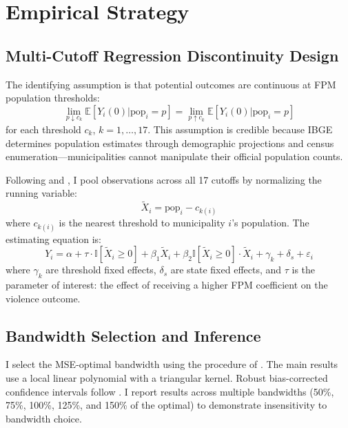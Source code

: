 \documentclass[12pt]{article}
\newcommand{\E}{\mathbb{E}}
\newcommand{\ind}{\mathbb{I}}
\begin{document}


\section{Empirical Strategy}

\subsection{Multi-Cutoff Regression Discontinuity Design}

The identifying assumption is that potential outcomes are continuous at FPM population thresholds:
\begin{equation}
\lim_{p \downarrow c_k} \E[Y_i(0) | \text{pop}_i = p] = \lim_{p \uparrow c_k} \E[Y_i(0) | \text{pop}_i = p]
\end{equation}
for each threshold $c_k$, $k = 1, \ldots, 17$. This assumption is credible because IBGE determines population estimates through demographic projections and census enumeration---municipalities cannot manipulate their official population counts.

Following \citet{cattaneo2016interpreting} and \citet{cattaneo2023multi}, I pool observations across all 17 cutoffs by normalizing the running variable:
\begin{equation}
\tilde{X}_i = \text{pop}_i - c_{k(i)}
\end{equation}
where $c_{k(i)}$ is the nearest threshold to municipality $i$'s population. The estimating equation is:
\begin{equation}
Y_i = \alpha + \tau \cdot \ind[\tilde{X}_i \geq 0] + \beta_1 \tilde{X}_i + \beta_2 \ind[\tilde{X}_i \geq 0] \cdot \tilde{X}_i + \gamma_k + \delta_s + \varepsilon_i
\label{eq:rdd}
\end{equation}
where $\gamma_k$ are threshold fixed effects, $\delta_s$ are state fixed effects, and $\tau$ is the parameter of interest: the effect of receiving a higher FPM coefficient on the violence outcome.

\subsection{Bandwidth Selection and Inference}

I select the MSE-optimal bandwidth using the procedure of \citet{cattaneo2014robust}. The main results use a local linear polynomial with a triangular kernel. Robust bias-corrected confidence intervals follow \citet{cattaneo2014robust}. I report results across multiple bandwidths (50\%, 75\%, 100\%, 125\%, and 150\% of the optimal) to demonstrate insensitivity to bandwidth choice.
\end{document}
